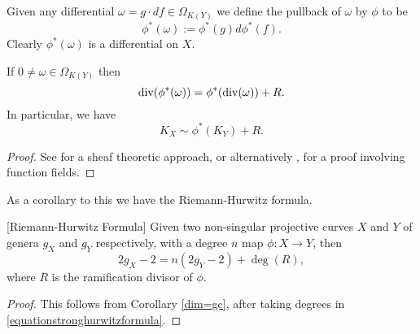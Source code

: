  
Given any differential $ \omega = g\cdot df \in \Omega_{K(Y)}$ we define the pullback of $\omega$ by $\phi$ to be
    \[
    \phi^*(\omega) := \phi^*(g)d\phi^*(f).
    \]
Clearly $\phi^*(\omega)$ is a differential on $X$.

    \begin{thm}\label{theoremdetailedhurwitz}
    If $0 \neq \omega \in \Omega_{K(Y)}$ then
        \begin{equation}\label{equationstronghurwitzformula}
        \operatorname{div}(\phi^*(\omega)) = \phi^*(\operatorname{div}(\omega)) + R.
        \end{equation}
    In particular, we have
        \[
        K_X \sim \phi^*(K_Y) + R.
        \]
    \end{thm}
    \begin{proof}
    See \cite[Chap.\ IV, \S 2, Prop.\ 2.3]{hart} for a sheaf theoretic approach, or alternatively \cite[Thm. 3.4.6]{stichtenoth}, for a proof involving function fields.
    \end{proof}


As a corollary to this we have the Riemann-Hurwitz formula.

    \begin{cor}\label{corhurwitzformula}[Riemann-Hurwitz Formula]
    Given two non-singular projective curves $X$ and $Y$ of genera $g_X$ and $g_Y$ respectively, with a degree $n$ map $\phi\colon X \rightarrow Y$, then
        \[
        2g_X - 2 = n(2g_Y -2) + \deg(R),
        \]
    where $R$ is the ramification divisor of $\phi$.
    \end{cor}
    \begin{proof}
    This follows from Corollary \ref{dim=gc}, after taking degrees in \eqref{equationstronghurwitzformula}.
    \end{proof}




















